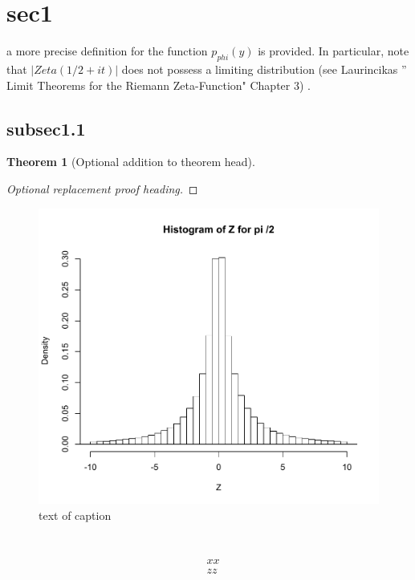 \documentclass{mcom-l}
\newtheorem{theorem}{Theorem}[section]
\theoremstyle{definition}
\theoremstyle{remark}
\numberwithin{equation}{section}
\begin{document}
\section{sec1}
a more precise definition for the function $p_{phi}(y)$ is provided.  In particular, note that $|Zeta(1/2+it)|$
 does not possess a limiting distribution (see Laurincikas '' Limit Theorems for the Riemann Zeta-Function" Chapter 3) . 

\subsection{subsec1.1}

\begin{theorem}[Optional addition to theorem head]
\end{theorem}

\begin{proof}[Optional replacement proof heading]
\end{proof}

\begin{figure}
\includegraphics{pi2plot.pdf}
\caption{text of caption}
\label{}
\end{figure}


\begin{equation}
\end{equation}

\begin{equation*}
\end{equation*}

\begin{align}
  & xx \\
  & zz
\end{align}
\end{document}
